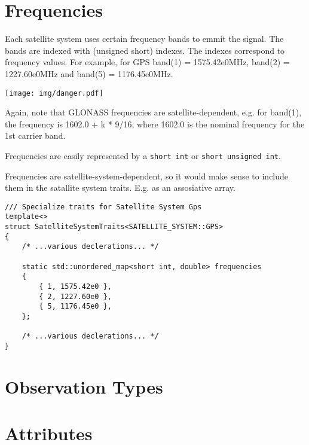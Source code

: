 \documentclass{article}
\newcommand{\alertwarningbox}[1]{
    \centering
    \colorbox{warningbackground}{\parbox{400pt} {
            \vskip 10pt
            \begin{floatingfigure}[l]{50pt}
                \texttt{[image: img/danger.pdf]}
            \end{floatingfigure}
            #1
            \vskip 10pt
        }
    }
}
\begin{document}
\section{Frequencies}

Each satellite system uses certain frequency bands to emmit the signal.
The bands are indexed with (unsigned short) indexes. The indexes correspond to
frequency values. For example, for GPS band(1) = 1575.42e0MHz, band(2) = 1227.60e0MHz
and band(5) = 1176.45e0MHz.

\alertwarningbox{Again, note that GLONASS frequencies
are satellite-dependent, e.g. for band(1), the frequency is 1602.0 + k * 9/16,
where 1602.0 is the nominal frequency for the 1st carrier band.}

Frequencies are easily represented by a \texttt{short int} or \texttt{short unsigned int}.

Frequencies are satellite-system-dependent, so it would make sense to include them
in the satallite system traits. E.g. as an assosiative array.
\begin{lstlisting}
/// Specialize traits for Satellite System Gps
template<>
struct SatelliteSystemTraits<SATELLITE_SYSTEM::GPS>
{
    /* ...various declerations... */
    
    static std::unordered_map<short int, double> frequencies
    {
        { 1, 1575.42e0 },
        { 2, 1227.60e0 },
        { 5, 1176.45e0 },
    };
    
    /* ...various declerations... */
}
\end{lstlisting}

\section{Observation Types}


\section{Attributes}






\end{document}
